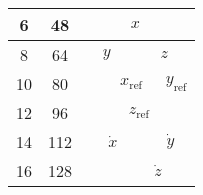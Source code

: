 \begin{table}[H]
\begin{tabular}{llclllllllllllllll}
\multicolumn{1}{|c|}{6}    & \multicolumn{1}{c|}{48}  & \multicolumn{3}{c|}{}                                                    & \multicolumn{10}{c|}{$x$}                                                                                                                                                                                                                                  & \multicolumn{3}{c|}{}                                                       \\ \hline
\multicolumn{1}{|c|}{8}    & \multicolumn{1}{c|}{64}  & \multicolumn{7}{c|}{$y$}                                                                                                                                                     & \multicolumn{9}{c|}{$z$}                                                                                                                                                                                                             \\ \hline
\multicolumn{1}{|c|}{10}   & \multicolumn{1}{c|}{80}  & \multicolumn{1}{c|}{}  & \multicolumn{10}{c|}{$x_{\mathrm{ref}}$}                                                                                                                                                                                                                          & \multicolumn{5}{c|}{$y_{\mathrm{ref}}$}                                                                                                  \\ \hline
\multicolumn{1}{|c|}{12}   & \multicolumn{1}{c|}{96}  & \multicolumn{5}{c|}{}                                                                                                      & \multicolumn{10}{c|}{$z_{\mathrm{ref}}$}                                                                                                                                                                                                                              & \multicolumn{1}{c|}{}   \\ \hline
\multicolumn{1}{|c|}{14}   & \multicolumn{1}{c|}{112} & \multicolumn{10}{c|}{$\dot{x}$}& \multicolumn{6}{c|}{$\dot{y}$}                                                       \\ \hline
\multicolumn{1}{|c|}{16}   & \multicolumn{1}{c|}{128} & \multicolumn{5}{c|}{}                                                                                                      & \multicolumn{11}{c|}{$\dot{z}$}                                                                                                                                                                                                                                                        \\ \hline

\end{tabular}
\end{table}
